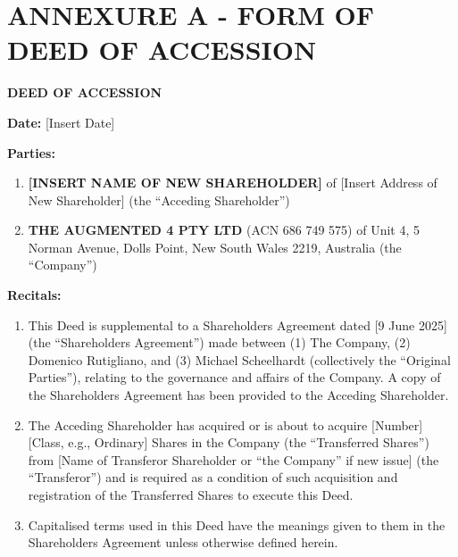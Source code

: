 \section*{ANNEXURE A - FORM OF DEED OF ACCESSION}

\textbf{DEED OF ACCESSION}

\textbf{Date:} [Insert Date]

\textbf{Parties:}
\begin{enumerate}
    \item \textbf{[INSERT NAME OF NEW SHAREHOLDER]} of [Insert Address of New Shareholder] (the ``Acceding Shareholder'')
    \item \textbf{THE AUGMENTED 4 PTY LTD} (ACN 686 749 575) of Unit 4, 5 Norman Avenue, Dolls Point, New South Wales 2219, Australia (the ``Company'')
\end{enumerate}

\textbf{Recitals:}
\begin{enumerate}[label=\Alph*.]
    \item This Deed is supplemental to a Shareholders Agreement dated [9 June 2025] (the ``Shareholders Agreement'') made between (1) The Company, (2) Domenico Rutigliano, and (3) Michael Scheelhardt (collectively the ``Original Parties''), relating to the governance and affairs of the Company. A copy of the Shareholders Agreement has been provided to the Acceding Shareholder.
    \item The Acceding Shareholder has acquired or is about to acquire [Number] [Class, e.g., Ordinary] Shares in the Company (the ``Transferred Shares'') from [Name of Transferor Shareholder or ``the Company'' if new issue] (the ``Transferor'') and is required as a condition of such acquisition and registration of the Transferred Shares to execute this Deed.
    \item Capitalised terms used in this Deed have the meanings given to them in the Shareholders Agreement unless otherwise defined herein.
\end{enumerate}

